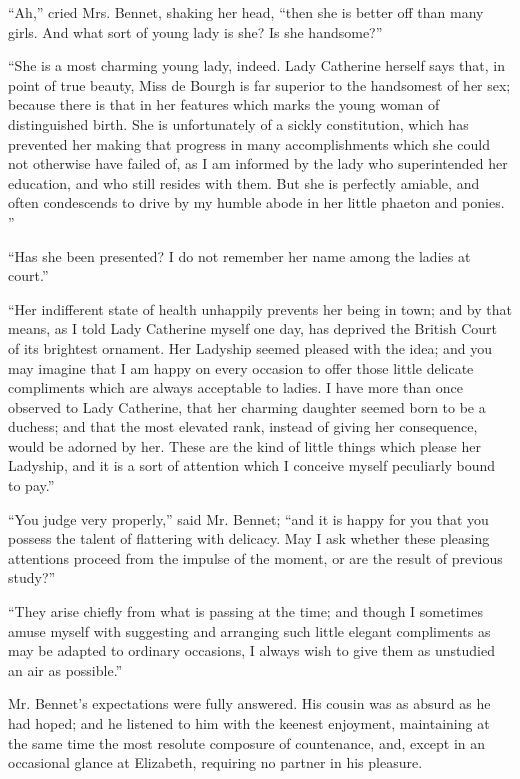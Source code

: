 \documentclass[10pt]{book}
\begin{document}
   “Ah,” cried Mrs. Bennet, shaking her head, “then she is better off than
many girls. And what sort of young lady is she? Is she handsome?”
  

   “She is a most charming young lady, indeed. Lady Catherine herself says
that, in point of true beauty, Miss de Bourgh is far superior to the
handsomest of her sex; because there is that in her features which marks
the young woman of distinguished birth. She is unfortunately of a sickly
constitution, which has prevented her making that progress in many
accomplishments which she could not otherwise have failed of, as I am
informed by the lady who superintended her education, and who still
resides with them. But she is perfectly amiable, and often condescends
to drive by my humble abode in her little phaeton and ponies.
   ”
  

   “Has she been presented? I do not remember her name among the ladies at
court.”
  

   “Her indifferent state of health unhappily prevents her being in town;
and by that means, as I told Lady Catherine myself one day, has deprived
the British Court of its brightest ornament. Her Ladyship seemed pleased
with the idea; and you may imagine that I am happy on every occasion to
offer those little delicate compliments which are always acceptable to
ladies. I have more than once observed to Lady Catherine, that her
charming daughter seemed born to be a duchess; and that the most
elevated rank, instead of giving her consequence, would be adorned by
her. These are the kind of little things which please her Ladyship, and
it is a sort of attention which I conceive myself peculiarly bound to
pay.”
  

   “You judge very properly,” said Mr. Bennet; “and it is happy for you
that you possess the talent of flattering with delicacy. May I ask
whether these pleasing attentions proceed from the impulse of the
moment, or are the result of previous study?”
  

   “They arise chiefly from what is passing at the time; and though I
sometimes amuse myself with suggesting and arranging such little elegant
compliments as may be adapted to ordinary occasions, I always wish to
give them as unstudied an air as possible.”
  

   Mr. Bennet’s expectations were fully answered. His cousin was as absurd
as he had hoped; and he listened to him with the keenest enjoyment,
maintaining at the same time the most resolute composure of countenance,
and, except in an occasional glance at Elizabeth, requiring no partner
in his pleasure.
  
\end{document}
